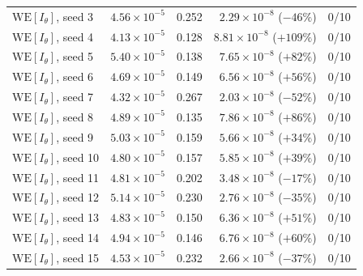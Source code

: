 \documentclass[a4paper,fleqn]{cas-sc}
\begin{document}
\begin{table}[H]
\begin{tabular}{lrrrr}
	$\mathrm{WE}[I_\theta]$, seed 3 & $4.56\times10^{-5}$ & 0.252 &
	$2.29\times10^{-8}$ ($-46\%$) & 0/10 \\
	$\mathrm{WE}[I_\theta]$, seed 4 & $4.13\times10^{-5}$ & 0.128 &
	$8.81\times10^{-8}$ ($+109\%$) & 0/10 \\
	$\mathrm{WE}[I_\theta]$, seed 5 & $5.40\times10^{-5}$ & 0.138 &
	$7.65\times10^{-8}$ ($+82\%$) & 0/10 \\
	$\mathrm{WE}[I_\theta]$, seed 6 & $4.69\times10^{-5}$ & 0.149 &
	$6.56\times10^{-8}$ ($+56\%$) & 0/10 \\
	$\mathrm{WE}[I_\theta]$, seed 7 & $4.32\times10^{-5}$ & 0.267 &
	$2.03\times10^{-8}$ ($-52\%$) & 0/10 \\
	$\mathrm{WE}[I_\theta]$, seed 8 & $4.89\times10^{-5}$ & 0.135 &
	$7.86\times10^{-8}$ ($+86\%$) & 0/10 \\
	$\mathrm{WE}[I_\theta]$, seed 9 & $5.03\times10^{-5}$ & 0.159 &
	$5.66\times10^{-8}$ ($+34\%$) & 0/10 \\
	$\mathrm{WE}[I_\theta]$, seed 10 & $4.80\times10^{-5}$ & 0.157 &
	$5.85\times10^{-8}$ ($+39\%$) & 0/10 \\
	$\mathrm{WE}[I_\theta]$, seed 11 & $4.81\times10^{-5}$ & 0.202 &
	$3.48\times10^{-8}$ ($-17\%$) & 0/10 \\
	$\mathrm{WE}[I_\theta]$, seed 12 & $5.14\times10^{-5}$ & 0.230 &
	$2.76\times10^{-8}$ ($-35\%$) & 0/10 \\
	$\mathrm{WE}[I_\theta]$, seed 13 & $4.83\times10^{-5}$ & 0.150 &
	$6.36\times10^{-8}$ ($+51\%$) & 0/10 \\
	$\mathrm{WE}[I_\theta]$, seed 14 & $4.94\times10^{-5}$ & 0.146 &
	$6.76\times10^{-8}$ ($+60\%$) & 0/10 \\
	$\mathrm{WE}[I_\theta]$, seed 15 & $4.53\times10^{-5}$ & 0.232 &
	$2.66\times10^{-8}$ ($-37\%$) & 0/10 \\
	\bottomrule
\end{tabular}
\end{table}
\end{document}
